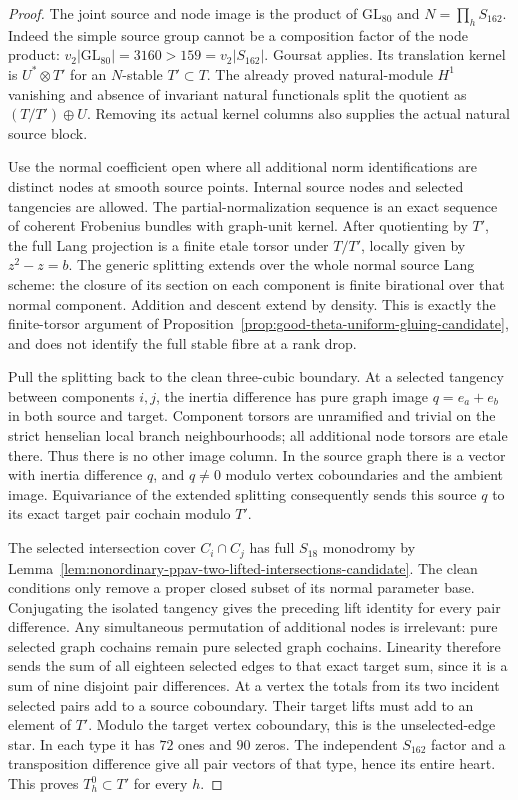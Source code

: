 \begin{proof}
The joint source and node image is the product of
$\mathrm{GL}_{80}$ and $N=\prod_hS_{162}$. Indeed the simple source
group cannot be a composition factor of the node product:
$v_2|\mathrm{GL}_{80}|=3160>159=v_2|S_{162}|$.
Goursat applies. Its translation kernel is $U^*\otimes T'$ for
an $N$-stable $T'\subset T$. The already proved natural-module
$H^1$ vanishing and absence of invariant natural functionals split
the quotient as $(T/T')\oplus U$. Removing its actual kernel
columns also supplies the actual natural source block.

Use the normal coefficient open where all additional norm
identifications are distinct nodes at smooth source points.
Internal source nodes and selected tangencies are allowed.
The partial-normalization sequence is an exact sequence of
coherent Frobenius bundles with graph-unit kernel. After quotienting
by $T'$, the full Lang projection is a finite etale torsor under
$T/T'$, locally given by $z^2-z=b$. The generic splitting extends
over the whole normal source Lang scheme: the closure of its
section on each component is finite birational over that normal
component. Addition and descent extend by density. This is exactly
the finite-torsor argument of
Proposition~\ref{prop:good-theta-uniform-gluing-candidate}, and
does not identify the full stable fibre at a rank drop.

Pull the splitting back to the clean three-cubic boundary.
At a selected tangency between components $i,j$, the inertia
difference has pure graph image
$q=e_a+e_b$ in both source and target. Component torsors are
unramified and trivial on the strict henselian local branch
neighbourhoods; all additional node torsors are etale there.
Thus there is no other image column. In the source graph there
is a vector with inertia difference $q$, and $q\ne0$ modulo
vertex coboundaries and the ambient image. Equivariance of the
extended splitting consequently sends this source $q$ to its
exact target pair cochain modulo $T'$.

The selected intersection cover $C_i\cap C_j$ has full $S_{18}$
monodromy by
Lemma~\ref{lem:nonordinary-ppav-two-lifted-intersections-candidate}.
The clean conditions only remove a proper closed subset of its
normal parameter base. Conjugating the isolated tangency gives
the preceding lift identity for every pair difference. Any
simultaneous permutation of additional nodes is irrelevant:
pure selected graph cochains remain pure selected graph cochains.
Linearity therefore sends the sum of all eighteen selected edges
to that exact target sum, since it is a sum of nine disjoint pair
differences. At a vertex the totals from its two incident selected
pairs add to a source coboundary. Their target lifts must add to
an element of $T'$. Modulo the target vertex coboundary, this is
the unselected-edge star. In each type it has $72$ ones and $90$
zeros. The independent $S_{162}$ factor and a transposition
difference give all pair vectors of that type, hence its entire
heart. This proves $T_h^0\subset T'$ for every $h$.
\end{proof}

